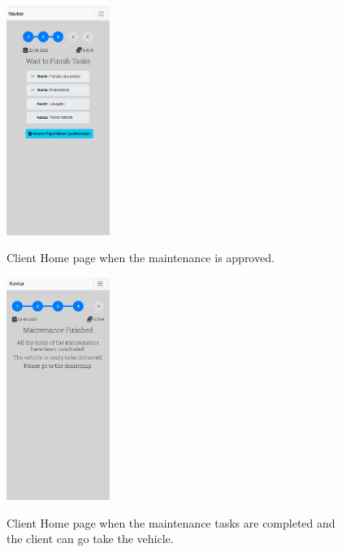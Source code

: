 \begin{figure}[htbp]
  \caption{Client Home page when the maintenance is approved.}
  \centering
  \includegraphics[width=0.30\textwidth]{figs/Implementation/client/MaintenanceState3}
  \label{fig:MaintenanceState3}
\end{figure}


\begin{figure}[htbp]
  \caption{Client Home page when the maintenance tasks are completed and the client can go take the vehicle.}
  \centering
  \includegraphics[width=0.30\textwidth]{figs/Implementation/client/MaintenanceState4}
  \label{fig:MaintenanceState4}
\end{figure}


